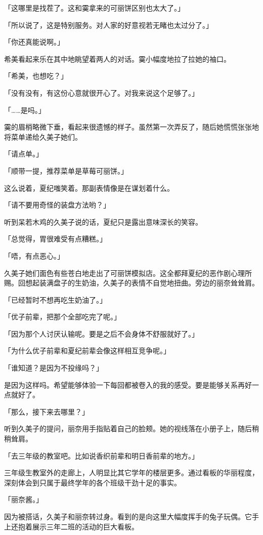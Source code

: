 \documentclass[UTF8]{ctexart}
\begin{document}
    「这哪里是找茬了。这和霙拿来的可丽饼区别也太大了。」

    「所以说了，这是特别服务。对人家的好意视若无睹也太过分了。」

    「你还真能说啊。」

    希美看起来乐在其中地眺望着两人的对话。霙小幅度地拉了拉她的袖口。

    「希美，也想吃？」

    「没有没有，有这份心意就很开心了。对我来说这个足够了。」

    「……是吗。」

    霙的眉梢略微下垂，看起来很遗憾的样子。虽然第一次弄反了，随后她慌慌张张地将菜单递给久美子她们。

    「请点单。」

    「顺带一提，推荐菜单是草莓可丽饼。」

    这么说着，夏纪嗤笑着。那副表情像是在谋划着什么。

    「请不要用奇怪的装盘方法哟？」

    听到呆若木鸡的久美子说的话，夏纪只是露出意味深长的笑容。

    「总觉得，胃很难受有点糟糕。」

    「唔，有点恶心。」

    久美子她们面色有些苍白地走出了可丽饼模拟店。这全都拜夏纪的恶作剧心理所赐。回想起装满盘子的生奶油，久美子的表情不自觉地扭曲。旁边的丽奈耸耸肩。

    「已经暂时不想再吃生奶油了。」

    「优子前辈，把那个全部吃完了呢。」

    「因为那个人讨厌认输呢。要是之后不会身体不舒服就好了。」

    「为什么优子前辈和夏纪前辈会像这样相互竞争呢。」

    「谁知道？是因为不投缘吗？」

    是因为这样吗。希望能够体验一下每回都被卷入的我的感受。要是能够关系再好一点就好了。

    「那么，接下来去哪里？」

    听到久美子的提问，丽奈用手指贴着自己的脸颊。她的视线落在小册子上，随后稍稍耸肩。

    「去三年级的教室吧。比如说香织前辈和明日香前辈的地方。」

    三年级生教室外的走廊上，人明显比其它学年的楼层更多。通过看板的华丽程度，深刻体会到只属于最终学年的各个班级干劲十足的事实。

    「丽奈酱。」

    因为被搭话，久美子和丽奈转过身。看到的是向这里大幅度挥手的兔子玩偶。它手上还抱着展示三年二班的活动的巨大看板。
\end{document}
